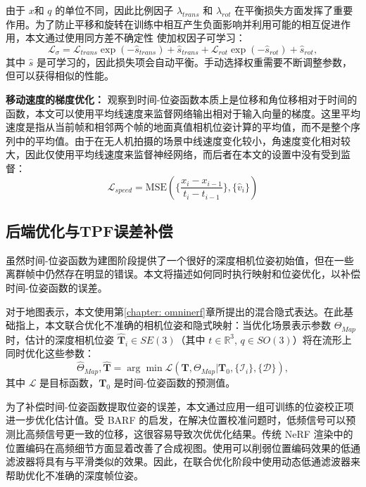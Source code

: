 由于 $x$和 $q$ 的单位不同，因此比例因子 $\lambda_{trans}$ 和 $\lambda_{rot}$ 在平衡损失方面发挥了重要作用。为了防止平移和旋转在训练中相互产生负面影响并利用可能的相互促进作用，本文通过使用同方差不确定性 \cite{kendall_geometric_2017} 使加权因子可学习：\begin{equation}
    \mathcal{L}_{\sigma} = \mathcal{L}_{trans} \exp(−\hat{s}_{trans}) + \hat{s}_{trans} + \mathcal{L}_{rot} \exp( −\hat{s}_{rot}) + \hat{s}_{rot},
\end{equation}
其中 $\hat{s}$ 是可学习的，因此损失项会自动平衡。手动选择权重需要不断调整参数，但可以获得相似的性能。

\textbf{移动速度的梯度优化：}
观察到时间-位姿函数本质上是位移和角位移相对于时间的函数，本文可以使用平均线速度来监督网络输出相对于输入向量的梯度。这里平均速度是指从当前帧和相邻两个帧的地面真值相机位姿计算的平均值，而不是整个序列中的平均值。由于在无人机拍摄的场景中线速度变化较小，角速度变化相对较大，因此仅使用平均线速度来监督神经网络，而后者在本文的设置中没有受到监督：
\begin{equation}
    \mathcal{L}_{speed} = \text{MSE}(\{\frac{x_i-x_{i-1}}{t_i-t_{i-1}}\}, \{\hat{v}_i\})
\end{equation}

\subsection{后端优化与TPF误差补偿}
虽然时间-位姿函数为建图阶段提供了一个很好的深度相机位姿初始值，但在一些离群帧中仍然存在明显的错误。本文将描述如何同时执行映射和位姿优化，以补偿时间-位姿函数的误差。

对于地图表示，本文使用第\ref{chapter: omninerf}章所提出的混合隐式表达。在此基础指上，本文联合优化不准确的相机位姿和隐式映射：当优化场景表示参数 $\Theta_{Map}$ 时，估计的深度相机位姿 $\hat{\mathbf{T}}_i \in SE(3)$（其中 $t \in \mathbb{R}^3$, $q \in SO(3)$）将在流形上同时优化这些参数：
\begin{equation}
    \hat{\Theta}_{Map},\hat{\mathbf{T}} = \arg\min\mathcal{L}(\mathbf{T}, \Theta_{Map} | \mathbf{T}_0, \{\mathcal{I}_i\}, \{\mathcal{D}\}),
\end{equation}
其中 $\mathcal{L}$ 是目标函数，$\mathbf{T}_0$ 是时间-位姿函数的预测值。

为了补偿时间-位姿函数提取位姿的误差，本文通过应用一组可训练的位姿校正项进一步优化估计值。受 BARF\cite{lin_barf_2021} 的启发，在解决位置校准问题时，低频信号可以预测比高频信号更一致的位移，这很容易导致次优优化结果。传统 NeRF 渲染中的位置编码在高频细节方面显着改善了合成视图。使用可以削弱位置编码效果的低通滤波器将具有与平滑类似的效果。因此，在联合优化阶段中使用动态低通滤波器来帮助优化不准确的深度帧位姿。

